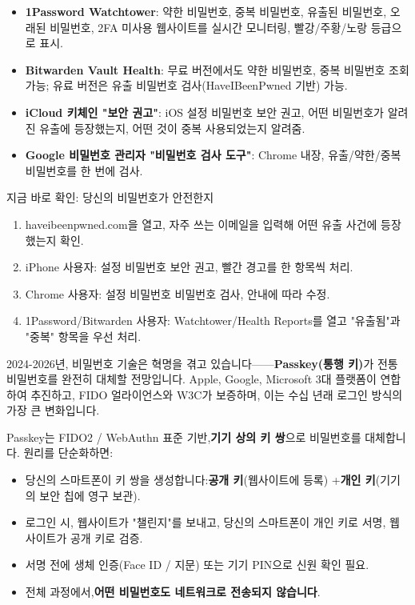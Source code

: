 
\begin{itemize}
  \item \textbf{1Password Watchtower}: 약한 비밀번호, 중복 비밀번호, 유출된 비밀번호, 오래된 비밀번호, 2FA 미사용 웹사이트를 실시간 모니터링, 빨강/주황/노랑 등급으로 표시.
  \item \textbf{Bitwarden Vault Health}: 무료 버전에서도 약한 비밀번호, 중복 비밀번호 조회 가능; 유료 버전은 유출 비밀번호 검사(HaveIBeenPwned 기반) 가능.
  \item \textbf{iCloud 키체인 "보안 권고"}: iOS 설정 비밀번호 보안 권고, 어떤 비밀번호가 알려진 유출에 등장했는지, 어떤 것이 중복 사용되었는지 알려줌.
  \item \textbf{Google 비밀번호 관리자 "비밀번호 검사 도구"}: Chrome 내장, 유출/약한/중복 비밀번호를 한 번에 검사.
\end{itemize}

\begin{tcbpractice}{지금 바로 확인: 당신의 비밀번호가 안전한지}
\begin{enumerate}
  \item haveibeenpwned.com을 열고, 자주 쓰는 이메일을 입력해 어떤 유출 사건에 등장했는지 확인.
  \item iPhone 사용자: 설정 비밀번호 보안 권고, 빨간 경고를 한 항목씩 처리.
  \item Chrome 사용자: 설정 비밀번호 비밀번호 검사, 안내에 따라 수정.
  \item 1Password/Bitwarden 사용자: Watchtower/Health Reports를 열고 "유출됨"과 "중복" 항목을 우선 처리.
\end{enumerate}

\end{tcbpractice}


2024-2026년, 비밀번호 기술은 혁명을 겪고 있습니다——\textbf{Passkey(통행 키)}가 전통 비밀번호를 완전히 대체할 전망입니다. Apple, Google, Microsoft 3대 플랫폼이 연합하여 추진하고, FIDO 얼라이언스와 W3C가 보증하며, 이는 수십 년래 로그인 방식의 가장 큰 변화입니다.


Passkey는 FIDO2 / WebAuthn 표준 기반,\textbf{기기 상의 키 쌍}으로 비밀번호를 대체합니다. 원리를 단순화하면:

\begin{itemize}
  \item 당신의 스마트폰이 키 쌍을 생성합니다:\textbf{공개 키}(웹사이트에 등록) +\textbf{개인 키}(기기의 보안 칩에 영구 보관).
  \item 로그인 시, 웹사이트가 "챌린지"를 보내고, 당신의 스마트폰이 개인 키로 서명, 웹사이트가 공개 키로 검증.
  \item 서명 전에 생체 인증(Face ID / 지문) 또는 기기 PIN으로 신원 확인 필요.
  \item 전체 과정에서,\textbf{어떤 비밀번호도 네트워크로 전송되지 않습니다}.
\end{itemize}


